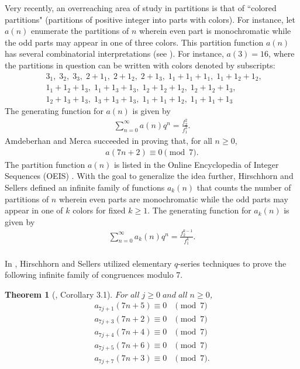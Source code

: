 \documentclass[a4paper,12pt,reqno]{amsart}
\newtheorem{theorem}{Theorem}[section]
\numberwithin{equation}{section}
\begin{document}
Very recently, an overreaching area of study in partitions is  that of ``colored partitions" (partitions of positive integer into parts with colors). For instance, let $a(n)$ enumerate the partitions of $n$ wherein even part is monochromatic while the odd parts may appear in one of three colors.  This partition function $a(n)$  has several combinatorial interpretations (see \cite{r1}). For instance, $a(3)=16$, where the partitions in question can be written with colors denoted by subscripts:  
	\begin{align*}
	& 3_1,\; 3_2,\; 3_3,\; 2+1_1,\; 2+1_2,\; 2+1_3, \;1_1+1_1+1_1,\;1_1+1_2+1_2,\;\\ 
      & 1_1+1_2+1_3,\; 1_1+1_3+1_3, \;1_2+1_2+1_2,\; 1_2+1_2+1_3,\;\\ 
     &1_2+1_3+1_3,\; 1_3+1_3+1_3,\; 1_1+1_1+1_2,\; 1_1+1_1+1_3
\end{align*}
	The generating function for $a(n)$ is given by 
	\begin{align*}
		\sum_{n=0}^{\infty} {a(n)q^n}=\frac{f_2^2}{f_1^3}.
	\end{align*}
	Amdeberhan and Merca \cite{r1} succeeded in proving that, for all $n\geq 0$, 
\begin{align*}
		a(7n+2) \equiv 0 \pmod{7}.
\end{align*}
	The partition function $a(n)$ is listed in the Online Encyclopedia of Integer Sequences (OEIS) \cite[A298311]{r15}.  
	With the goal to generalize the idea further, Hirschhorn and Sellers \cite{r4} defined an infinite family of functions $a_k(n)$  that counts the number of partitions of $n$ wherein even parts are monochromatic while the odd parts may appear in one of $k$ colors for fixed $k\geq 1$. The generating function for $a_k(n)$ is given by
	\begin{align}
	\sum_{n=0}^{\infty}a_k(n)q^n=\frac{f_2^{k-1}}{f_1^k}.\label{1.a}
\end{align}\\
	 In \cite{r4}, Hirschhorn and Sellers utilized elementary $q$-series techniques to prove the following infinite family of congruences modulo 7.\\
	 \begin{theorem}[\cite{r4}, Corollary 3.1]\label{t:2.1.1} 
	 $For \; all \; j\geq0 \; and \; all \; n\geq0$,\\
	 \begin{align}
	 a_{7j+1}(7n+5)\equiv 0& \pmod{7}\label{c1}\\
	 a_{7j+3}(7n+2)\equiv 0& \pmod{7}\label{c2}\\
	 a_{7j+4}(7n+4)\equiv 0& \pmod{7}\label{c3}\\
	 a_{7j+5}(7n+6)\equiv 0& \pmod{7}\label{c4}\\
	 a_{7j+7}(7n+3)\equiv 0& \pmod{7}\label{c5}.
	  \end{align}
	  	\end{theorem}
\end{document}
